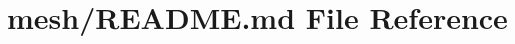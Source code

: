 \hypertarget{mesh_2README_8md}{}\section{mesh/\+R\+E\+A\+D\+M\+E.md File Reference}
\label{mesh_2README_8md}
